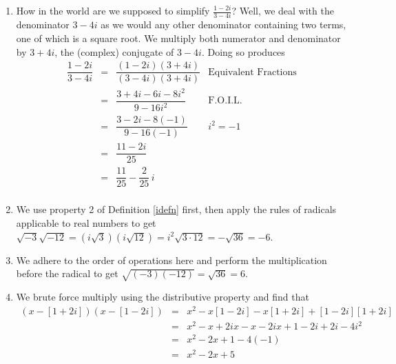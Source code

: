 \documentclass{ximera}
\begin{document}
\begin{exampleSol}
\begin{enumerate}
        \item  How in the world are we supposed to simplify $\frac{1-2i}{3-4i}$?  Well, we deal with the denominator $3-4i$ as we would any other denominator containing two terms, one of which is a square root. We multiply both numerator and denominator by $3+4i$, the (complex) conjugate of $3 - 4i$.  Doing so produces
        \[
            \begin{array}{rclr}
                \dfrac{1-2i}{3-4i}  & = & \dfrac{(1-2i)(3+4i)}{(3-4i)(3+4i)}        & \text{Equivalent Fractions} \\[8pt]
                                    & = &   \dfrac{3 + 4i - 6i - 8i^2}{9 - 16i^2}   & \text{F.O.I.L.}\\[8pt]
                                    & = & \dfrac{3 - 2i - 8(-1)}{9  - 16(-1)}       & \text{$i^2 = -1$}\\[8pt]
                                    & = &  \dfrac{11 - 2i}{25}                      & \\[8pt]
                                    & = & \dfrac{11}{25} - \dfrac{2}{25} \, i       & \\ 
            \end{array}
        \]
        \item  We use property 2 of Definition \ref{idefn} first, then apply the rules of radicals applicable to real numbers to get 
        $\sqrt{-3} \sqrt{-12} = \left(i \sqrt{3}\right) \left(i \sqrt{12}\right) = i^2 \sqrt{3\cdot 12} = -\sqrt{36} = -6$.
        \item  We adhere to the order of operations here and perform the multiplication before the radical to get  
        $\sqrt{(-3)(-12)} = \sqrt{36} = 6$. 
        \item  We brute force multiply using the distributive property and find that 
        \[
            \begin{array}{rcl} 
                (x-[1+2i])(x-[1-2i])& = &  x^2 -x[1-2i]-x[1+2i]+[1-2i][1+2i] \\[2pt]
                                    &	= & x^2-x+2ix-x-2ix+1-2i+2i-4i^2  \\ [2pt]
                                    &	= & x^2-2x + 1-4(-1)\\[2pt]
                                    & =  & x^2 -2x +5 \\ 
            \end{array}
        \] %
    \end{enumerate}
\end{exampleSol}
\end{document}
